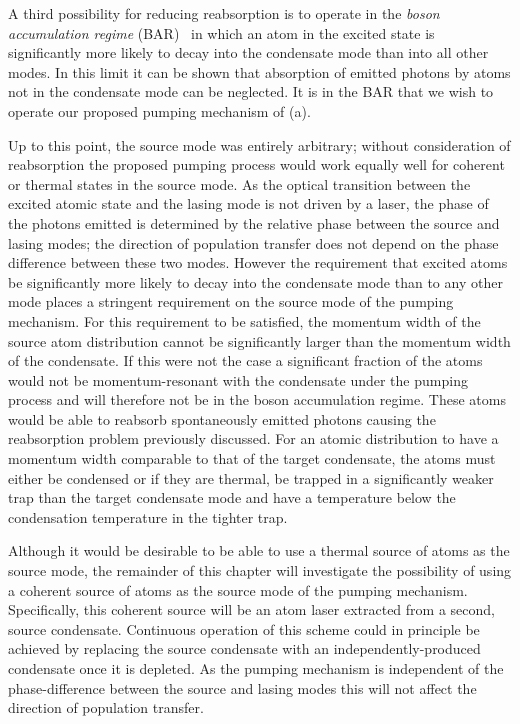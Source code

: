 A third possibility for reducing reabsorption is to operate in the \emph{boson accumulation regime} (BAR)~\citep{Cirac:1996rr,Floegel:2001} in which an atom in the excited state is significantly more likely to decay into the condensate mode than into all other modes.  In this limit it can be shown that absorption of emitted photons by atoms not in the condensate mode can be neglected.  It is in the BAR that we wish to operate our proposed pumping mechanism of (a).  

Up to this point, the source mode was entirely arbitrary; without consideration of reabsorption the proposed pumping process would work equally well for coherent or thermal states in the source mode.  As the optical transition between the excited atomic state and the lasing mode is not driven by a laser, the phase of the photons emitted is determined by the relative phase between the source and lasing modes; the direction of population transfer does not depend on the phase difference between these two modes. However the requirement that excited atoms be significantly more likely to decay into the condensate mode than to any other mode places a stringent requirement on the source mode of the pumping mechanism.  For this requirement to be satisfied, the momentum width of the source atom distribution cannot be significantly larger than the momentum width of the condensate.  If this were not the case a significant fraction of the atoms would not be momentum-resonant with the condensate under the pumping process and will therefore not be in the boson accumulation regime.  These atoms would be able to reabsorb spontaneously emitted photons causing the reabsorption problem previously discussed.  For an atomic distribution to have a momentum width comparable to that of the target condensate, the atoms must either be condensed or if they are thermal, be trapped in a significantly weaker trap than the target condensate mode and have a temperature below the condensation temperature in the tighter trap.  

Although it would be desirable to be able to use a thermal source of atoms as the source mode, the remainder of this chapter will investigate the possibility of using a coherent source of atoms as the source mode of the pumping mechanism.  Specifically, this coherent source will be an atom laser extracted from a second, source condensate.  Continuous operation of this scheme could in principle be achieved by replacing the source condensate with an independently-produced condensate once it is depleted.  As the pumping mechanism is independent of the phase-difference between the source and lasing modes this will not affect the direction of population transfer.

